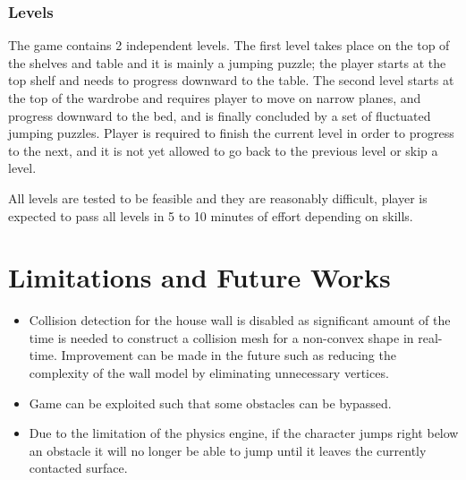 \documentclass[12pt, a4paper, oneside]{article}
\begin{document}
    \subsubsection{Levels}

    The game contains 2 independent levels. The first level takes place on the top of the shelves and table and it is mainly a jumping puzzle; the player starts at the top shelf and needs to progress downward to the table. The second level starts at the top of the wardrobe and requires player to move on narrow planes, and progress downward to the bed, and is finally concluded by a set of fluctuated jumping puzzles. Player is required to finish the current level in order to progress to the next, and it is not yet allowed to go back to the previous level or skip a level.

    All levels are tested to be feasible and they are reasonably difficult, player is expected to pass all levels in 5 to 10 minutes of effort depending on skills.
    
    \section{Limitations and Future Works}

    \begin{itemize}[label=\(\diamond\)]
        \item Collision detection for the house wall is disabled as significant amount of the time is needed to construct a collision mesh for a non-convex shape in real-time. Improvement can be made in the future such as reducing the complexity of the wall model by eliminating unnecessary vertices.
        \item Game can be exploited such that some obstacles can be bypassed.
        \item Due to the limitation of the physics engine, if the character jumps right below an obstacle it will no longer be able to jump until it leaves the currently contacted surface.
    \end{itemize}

    
    
\end{document}
